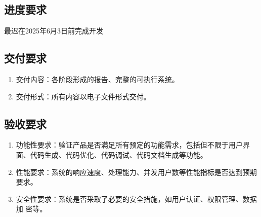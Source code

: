 \documentclass[
    report,     %
    oneside,    %
    UTF8,       %
    zihao=-4    %
]{config} %
\begin{document}
\subsection{进度要求}
最迟在2025年6月3日前完成开发
\subsection{交付要求}
\begin{enumerate}[label=(\arabic*)]
    \item 交付内容：各阶段形成的报告、完整的可执行系统。
    \item 交付形式：所有内容以电子文件形式交付。
\end{enumerate}
\subsection{验收要求}
\begin{enumerate}[label=(\arabic*)]
    \item 功能性要求：验证产品是否满足所有预定的功能需求，包括但不限于用户界面、代码生成、代码优化、代码调试、代码文档生成等功能。
    \item 性能要求：系统的响应速度、处理能力、并发用户数等性能指标是否达到预期要求。
    \item 安全性要求：系统是否采取了必要的安全措施，如用户认证、权限管理、数据加
    密等。
\end{enumerate}
\end{document}
